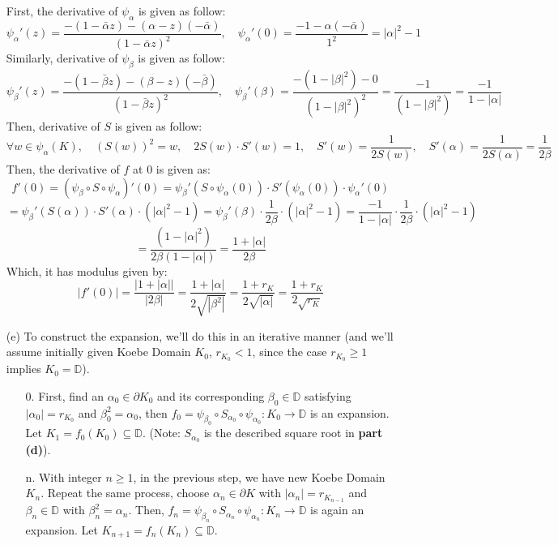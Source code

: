 \documentclass{article}
\begin{document}
\begin{itemize}
    First, the derivative of $\psi_\alpha$ is given as follow:
    $$\psi_\alpha'(z)=\frac{-(1-\bar{\alpha}z)-(\alpha-z)(-\bar{\alpha})}{(1-\bar{\alpha}z)^2},\quad \psi_\alpha'(0)=\frac{-1-\alpha(-\bar{\alpha})}{1^2}=|\alpha|^2-1$$
    Similarly, derivative of $\psi_\beta$ is given as follow:
    $$\psi_\beta'(z)=\frac{-(1-\bar{\beta}z)-(\beta-z)(-\bar{\beta})}{(1-\bar{\beta}z)^2},\quad \psi_\beta'(\beta)=\frac{-(1-|\beta|^2)-0}{(1-|\beta|^2)^2} = \frac{-1}{(1-|\beta|^2)}=\frac{-1}{1-|\alpha|}$$
    Then, derivative of $S$ is given as follow:
    $$\forall w\in \psi_\alpha(K),\quad (S(w))^2 = w,\quad 2S(w)\cdot S'(w)=1,\quad S'(w)=\frac{1}{2S(w)},\quad S'(\alpha)=\frac{1}{2S(\alpha)}=\frac{1}{2\beta}$$
    Then, the derivative of $f$ at $0$ is given as:
    $$f'(0)=(\psi_\beta\circ S\circ \psi_\alpha)'(0) = \psi_\beta'(S\circ \psi_\alpha(0))\cdot S'(\psi_\alpha(0))\cdot \psi_\alpha'(0)$$
    $$ = \psi_\beta'(S(\alpha))\cdot S'(\alpha)\cdot (|\alpha|^2-1) = \psi_\beta'(\beta)\cdot \frac{1}{2\beta}\cdot (|\alpha|^2-1) = \frac{-1}{1-|\alpha|}\cdot \frac{1}{2\beta}\cdot (|\alpha|^2-1)$$
    $$ = \frac{(1-|\alpha|^2)}{2\beta(1-|\alpha|)}=\frac{1+|\alpha|}{2\beta}$$
    Which, it has modulus given by:
    $$|f'(0)| = \frac{|1+|\alpha||}{|2\beta|} = \frac{1+|\alpha|}{2\sqrt{|\beta^2|}} = \frac{1+r_K}{2\sqrt{|\alpha|}}=\frac{1+r_K}{2\sqrt{r_K}}$$

    \hfil

    \item[(e)] To construct the expansion, we'll do this in an iterative manner (and we'll assume initially given Koebe Domain $K_0$, $r_{K_0}<1$, since the case $r_{K_0}\geq 1$ implies $K_0=\mathbb{D}$). 
    \begin{itemize}
        \item[0.] First, find an $\alpha_0\in \partial K_0$ and its corresponding $\beta_0\in \mathbb{D}$ satisfying $|\alpha_0|=r_{K_0}$ and $\beta_0^2=\alpha_0$, then $f_0=\psi_{\beta_0}\circ S_{\alpha_0}\circ \psi_{\alpha_0}:K_0\rightarrow\mathbb{D}$ is an expansion.
        Let $K_1=f_0(K_0)\subseteq \mathbb{D}$. (Note: $S_{\alpha_0}$ is the described square root in \textbf{part (d)}).

        \item[n.] With integer $n\geq 1$, in the previous step, we have new Koebe Domain $K_{n}$. Repeat the same process, choose $\alpha_n\in\partial K$ with $|\alpha_n|=r_{K_{n-1}}$ and $\beta_n\in\mathbb{D}$ with $\beta_n^2=\alpha_n$.
        Then, $f_n=\psi_{\beta_n}\circ S_{\alpha_n}\circ\psi_{\alpha_n}:K_n\rightarrow\mathbb{D}$ is again an expansion. Let $K_{n+1}=f_n(K_n)\subseteq\mathbb{D}$.
    \end{itemize}


\end{itemize}
\end{document}
